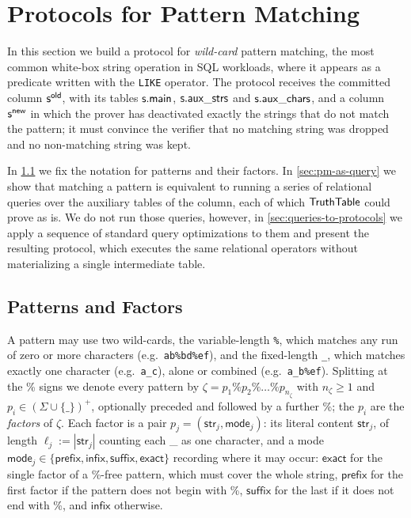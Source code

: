 \section{Protocols for Pattern Matching}
\label{sec:pattern-matching}

In this section we build a protocol for \emph{wild-card} pattern matching, the most common white-box string operation in SQL workloads, where it appears as a predicate written with the \texttt{LIKE} operator. The protocol receives the committed column $\mathsf{s}^{\mathsf{old}}$, with its tables $\mathsf{s}.\mathsf{main}$, $\mathsf{s}.\mathsf{aux\_strs}$ and $\mathsf{s}.\mathsf{aux\_chars}$, and a column $\mathsf{s}^{\mathsf{new}}$ in which the prover has deactivated exactly the strings that do not match the pattern; it must convince the verifier that no matching string was dropped and no non-matching string was kept. 

In \cref{sec:patterns and factors} we fix the notation for patterns and their factors. In \cref{sec:pm-as-query} we show that matching a pattern is equivalent to running a series of relational queries over the auxiliary tables of the column, each of which $\mathsf{TruthTable}$ could prove as is. We do not run those queries, however, in \cref{sec:queries-to-protocols} we apply a sequence of standard query optimizations to them and present the resulting protocol, which executes the same relational operators without materializing a single intermediate table.


\subsection{Patterns and Factors}
\label{sec:patterns and factors}
A pattern may use two wild-cards, the variable-length \texttt{\%}, which matches any run of zero or more characters (e.g.\ \texttt{ab\%bd\%ef}), and the fixed-length \texttt{\_}, which matches exactly one character (e.g.\ \texttt{a\_c}), alone or combined (e.g.\ \texttt{a\_b\%ef}). Splitting at the \% signs we denote every pattern by $\zeta = p_1 \% p_2 \% \dots \% p_{n_\zeta}$ with $n_\zeta \ge 1$ and $p_i \in (\Sigma \cup \{\text{\_}\})^{+}$, optionally preceded and followed by a further \%; the $p_i$ are the \emph{factors} of $\zeta$. Each factor is a pair $p_j=(\mathsf{str}_j,\mathsf{mode}_j)$: its literal content $\mathsf{str}_j$, of length $\ell_j:=|\mathsf{str}_j|$ counting each \_ as one character, and a mode $\mathsf{mode}_j\in\{\mathsf{prefix},\mathsf{infix},\mathsf{suffix},\mathsf{exact}\}$ recording where it may occur: $\mathsf{exact}$ for the single factor of a \%-free pattern, which must cover the whole string, $\mathsf{prefix}$ for the first factor if the pattern does not begin with \%, $\mathsf{suffix}$ for the last if it does not end with \%, and $\mathsf{infix}$ otherwise.




